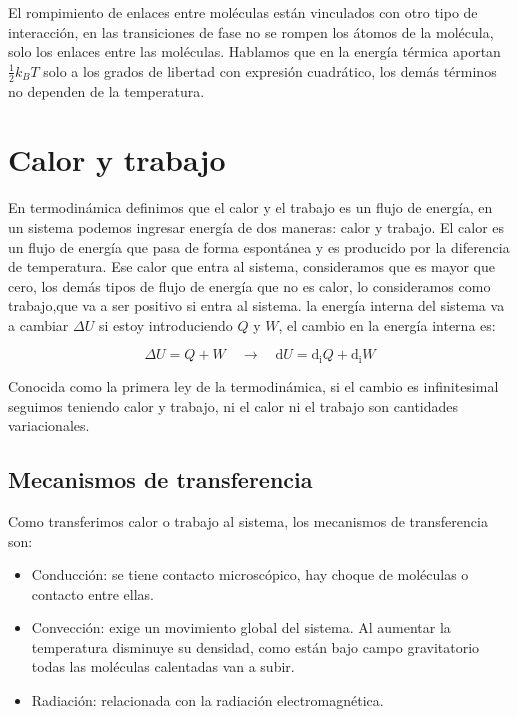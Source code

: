 \documentclass[11pt,fleqn]{book}
\begin{document}
El rompimiento de enlaces entre moléculas están vinculados con otro tipo de interacción, en las transiciones de fase no se rompen los átomos de la molécula, solo los enlaces entre las moléculas. Hablamos que en la energía térmica aportan $\frac{1}{2}k_{B}T$ solo a los grados de libertad con expresión cuadrático, los demás términos no dependen de la temperatura.

\section{Calor y trabajo}

En termodinámica definimos que el calor y el trabajo es un flujo de energía, en un sistema podemos ingresar energía de dos maneras: calor y trabajo. El calor es un flujo de energía que pasa de forma espontánea y es producido por la diferencia de temperatura. Ese calor que entra al sistema, consideramos que es mayor que cero, los demás tipos de flujo de energía que no es calor, lo consideramos como trabajo,que va a ser positivo si entra al sistema. la energía interna del sistema va a cambiar $\Delta U$ si estoy introduciendo $Q$ y $W$, el cambio en la energía interna es:

\begin{equation}
    \Delta U=Q+W \quad\longrightarrow\quad\mathrm{d}U=\mathrm{d_{i}}Q+\mathrm{d_{i}}W
    \label{Eq. 1.10}
\end{equation}

Conocida como la primera ley de la termodinámica, si el cambio es infinitesimal seguimos teniendo calor y trabajo, ni el calor ni el trabajo son cantidades variacionales.

\subsection{Mecanismos de transferencia}

Como transferimos calor o trabajo al sistema, los mecanismos de transferencia son: 

\begin{itemize}
    \item Conducción: se tiene contacto microscópico, hay choque de moléculas o contacto entre ellas.
    \item  Convección: exige un movimiento global del sistema. Al aumentar la temperatura disminuye su densidad, como están bajo campo gravitatorio todas las moléculas calentadas van a subir.
    \item  Radiación: relacionada con la radiación electromagnética. 
\end{itemize}
\end{document}

